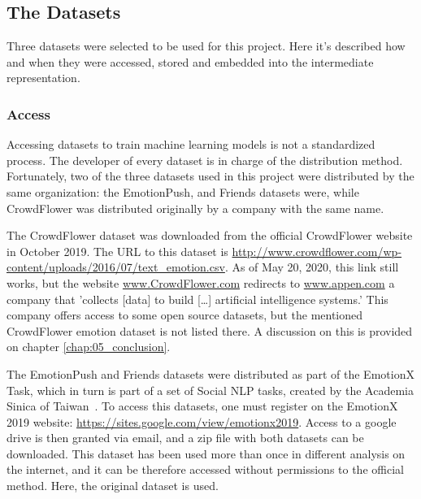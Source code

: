 \subsection{The Datasets}\label{sub:The Datasets}
Three datasets were selected to be used for this project. Here it's described how and when they were accessed, stored and embedded into the intermediate representation.

\subsubsection{Access}\label{subs:Access}
Accessing datasets to train machine learning models is not a standardized process. The developer of every dataset is in charge of the distribution method. Fortunately, two of the three datasets used in this project were distributed by the same organization: the EmotionPush, and Friends datasets were, while CrowdFlower was distributed originally by a company with the same name.

The CrowdFlower dataset was downloaded from the official CrowdFlower website in October 2019. The URL to this dataset is \url{http://www.crowdflower.com/wp-content/uploads/2016/07/text_emotion.csv}. As of May 20, 2020, this link still works, but the website \url{www.CrowdFlower.com} redirects to \url{www.appen.com} a company that 'collects [data] to build [\ldots] artificial intelligence systems.' This company offers access to some open source datasets, but the mentioned CrowdFlower emotion dataset is not listed there. A discussion on this is provided on chapter \ref{chap:05_conclusion}.

The EmotionPush and Friends datasets were distributed as part of the EmotionX Task, which in turn is part of a set of Social NLP tasks, created by the Academia Sinica of Taiwan~\cite{chen2018emotionlines}. To access this datasets, one must register on the EmotionX 2019 website: \url{https://sites.google.com/view/emotionx2019}. Access to a google drive is then granted via email, and a zip file with both datasets can be downloaded. This dataset has been used more than once in different analysis on the internet, and it can be therefore accessed without permissions to the official method. Here, the original dataset is used.

